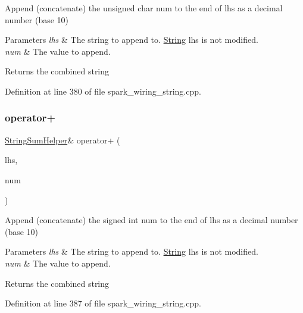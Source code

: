 Append (concatenate) the unsigned char num to the end of lhs as a decimal number (base 10) 


\begin{DoxyParams}{Parameters}
{\em lhs} & The string to append to. \hyperlink{class_string}{String} lhs is not modified.\\
\hline
{\em num} & The value to append.\\
\hline
\end{DoxyParams}
\begin{DoxyReturn}{Returns}
the combined string 
\end{DoxyReturn}


Definition at line 380 of file spark\+\_\+wiring\+\_\+string.\+cpp.

\mbox{\label{class_string_a0c7b23137b894e0e6d7607d8386a9285}} 
\subsubsection{\texorpdfstring{operator+}{operator+}\hspace{0.1cm}{\footnotesize\ttfamily [5/10]}}
{\footnotesize\ttfamily \hyperlink{class_string_sum_helper}{String\+Sum\+Helper}\& operator+ (\begin{DoxyParamCaption}\item[{const \hyperlink{class_string_sum_helper}{String\+Sum\+Helper} \&}]{lhs,  }\item[{int}]{num }\end{DoxyParamCaption})\hspace{0.3cm}{\ttfamily [friend]}}



Append (concatenate) the signed int num to the end of lhs as a decimal number (base 10) 


\begin{DoxyParams}{Parameters}
{\em lhs} & The string to append to. \hyperlink{class_string}{String} lhs is not modified.\\
\hline
{\em num} & The value to append.\\
\hline
\end{DoxyParams}
\begin{DoxyReturn}{Returns}
the combined string 
\end{DoxyReturn}


Definition at line 387 of file spark\+\_\+wiring\+\_\+string.\+cpp.


